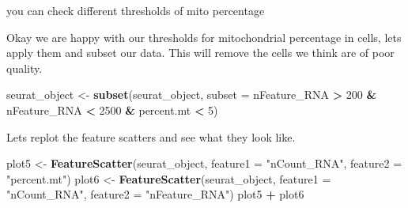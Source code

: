 \documentclass[
]{book}
\newenvironment{Shaded}{\begin{snugshade}}{\end{snugshade}}
\newcommand{\AttributeTok}[1]{\textcolor[rgb]{0.13,0.29,0.53}{#1}}
\newcommand{\CommentTok}[1]{\textcolor[rgb]{0.56,0.35,0.01}{\textit{#1}}}
\newcommand{\DecValTok}[1]{\textcolor[rgb]{0.00,0.00,0.81}{#1}}
\newcommand{\FunctionTok}[1]{\textcolor[rgb]{0.13,0.29,0.53}{\textbf{#1}}}
\newcommand{\NormalTok}[1]{#1}
\newcommand{\OtherTok}[1]{\textcolor[rgb]{0.56,0.35,0.01}{#1}}
\newcommand{\SpecialCharTok}[1]{\textcolor[rgb]{0.81,0.36,0.00}{\textbf{#1}}}
\newcommand{\StringTok}[1]{\textcolor[rgb]{0.31,0.60,0.02}{#1}}
\begin{document}
you can check different thresholds of mito percentage

\begin{Shaded}
\end{Shaded}

Okay we are happy with our thresholds for mitochondrial percentage in cells, lets apply them and subset our data. This will remove the cells we think are of poor quality.

\begin{Shaded}
\begin{Highlighting}[]
\NormalTok{seurat\_object }\OtherTok{\textless{}{-}} \FunctionTok{subset}\NormalTok{(seurat\_object, }\AttributeTok{subset =}\NormalTok{ nFeature\_RNA }\SpecialCharTok{\textgreater{}} \DecValTok{200} \SpecialCharTok{\&}\NormalTok{ nFeature\_RNA }\SpecialCharTok{\textless{}} \DecValTok{2500} \SpecialCharTok{\&}\NormalTok{ percent.mt }\SpecialCharTok{\textless{}} \DecValTok{5}\NormalTok{)}
\end{Highlighting}
\end{Shaded}

Lets replot the feature scatters and see what they look like.

\begin{Shaded}
\begin{Highlighting}[]
\NormalTok{plot5 }\OtherTok{\textless{}{-}} \FunctionTok{FeatureScatter}\NormalTok{(seurat\_object, }\AttributeTok{feature1 =} \StringTok{"nCount\_RNA"}\NormalTok{, }\AttributeTok{feature2 =} \StringTok{"percent.mt"}\NormalTok{) }
\NormalTok{plot6 }\OtherTok{\textless{}{-}} \FunctionTok{FeatureScatter}\NormalTok{(seurat\_object, }\AttributeTok{feature1 =} \StringTok{"nCount\_RNA"}\NormalTok{, }\AttributeTok{feature2 =} \StringTok{"nFeature\_RNA"}\NormalTok{) }
\NormalTok{plot5 }\SpecialCharTok{+}\NormalTok{ plot6}
\end{Highlighting}
\end{Shaded}
\end{document}
